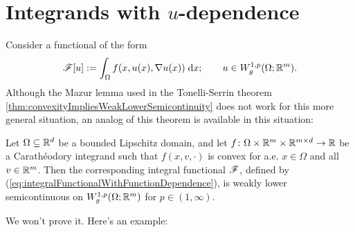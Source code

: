 \section{Integrands with $u$-dependence}
Consider a functional of the form
\begin{equation} \label{eq:integralFunctionalWithFunctionDependence}
    \mathscr{F}[u] := \int_\Omega f(x,u(x),\nabla u(x)) \; \mathrm{d} x; \hspace{20pt} u \in W^{1,p}_g(\Omega;\mathbb{R}^m).
\end{equation}
Although the Mazur lemma used in the Tonelli-Serrin theorem \ref{thm:convexityImpliesWeakLowerSemicontinuity} does not work for this more general situation, an analog of this theorem is available in this situation:
\begin{theorem}
    Let $\Omega \subseteq \mathbb{R}^d$ be a bounded Lipschitz domain, and let $f \colon \Omega \times \mathbb{R}^m \times \mathbb{R}^{m \times d} \to \mathbb{R}$ be a Carath\'eodory integrand such that $f(x,v,\cdot)$ is convex for a.e. $x \in \Omega$ and all $v \in \mathbb{R}^m$. Then the corresponding integral functional $\mathscr{F}$, defined by (\ref{eq:integralFunctionalWithFunctionDependence}), is weakly lower semicontinuous on $W^{1,p}_g(\Omega;\mathbb{R}^m)$ for $p \in (1,\infty)$.
\end{theorem}
We won't prove it. Here's an example:
